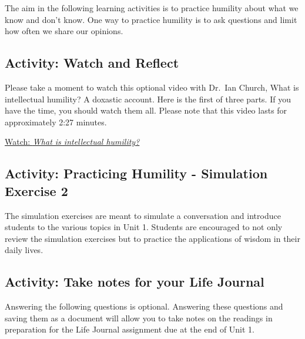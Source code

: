 \documentclass[
]{book}
\begin{document}
The aim in the following learning activities is to practice humility about what we know and don't know. One way to practice humility is to ask questions and limit how often we share our opinions.

\hypertarget{activity-watch-and-reflect-2}{%
\subsection*{Activity: Watch and Reflect}\label{activity-watch-and-reflect-2}}

\begin{reflect}
Please take a moment to watch this optional video with Dr.~Ian Church, What is intellectual humility? A doxastic account. Here is the first of three parts. If you have the time, you should watch them all. Please note that this video lasts for approximately 2:27 minutes.

\href{https://www.youtube.com/watch?v=8CZIkGEJYRY}{Watch: \emph{What is intellectual humility?}}
\end{reflect}

\hypertarget{activity-practicing-humility---simulation-exercise-2}{%
\subsection*{Activity: Practicing Humility - Simulation Exercise 2}\label{activity-practicing-humility---simulation-exercise-2}}

\begin{reflect}
The simulation exercises are meant to simulate a conversation and introduce students to the various topics in Unit 1. Students are encouraged to not only review the simulation exercises but to practice the applications of wisdom in their daily lives.
\end{reflect}

\hypertarget{activity-take-notes-for-your-life-journal-2}{%
\subsection*{Activity: Take notes for your Life Journal}\label{activity-take-notes-for-your-life-journal-2}}

\begin{reflect}
Answering the following questions is optional. Answering these questions and saving them as a document will allow you to take notes on the readings in preparation for the Life Journal assignment due at the end of Unit 1.
\end{reflect}
\end{document}
